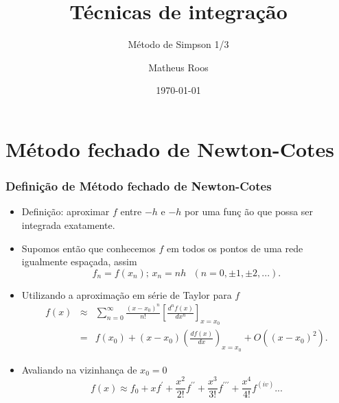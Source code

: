 \documentclass[xcolor=table]{beamer}
\begin{document}
\title[Simpson 1/3]{Técnicas de integração}
\subtitle{Método de Simpson 1/3}
\author[Roos]{Matheus Roos}
\date{\today}
\maketitle

\begin{frame}
	\tableofcontents
\end{frame}

\section{M\'{e}todo fechado de Newton-Cotes}

\begin{frame}%

\frametitle{Defini\c{c}\~{a}o de M\'{e}todo fechado de Newton-Cotes}

\begin{itemize}
\item Defini\c{c}\~{a}o: aproximar $f$ entre $-h$ e $-h$ por uma fun\c{c}%
\~{a}o que possa ser integrada exatamente.

\item Supomos ent\~{a}o que conhecemos $f$ em todos os pontos de uma rede
igualmente espa\c{c}ada, assim%
\[
f_{n}=f\left( x_{n}\right) \text{; \ \ \ \ \ \ \ }x_{n}=nh\text{ \ \ \ }%
\left( n=0,\pm 1,\pm 2,...\right) . 
\]

\item Utilizando a aproxima\c{c}\~{a}o em s\'{e}rie de Taylor para $f$%
\begin{eqnarray*}
f\left( x\right)  &\approx &\sum_{n=0}^{\infty }\frac{\left( x-x_{0}\right)
^{n}}{n!}\left[ \frac{d^{n}f(x)}{dx^{n}}\right] _{x=x_{0}} \\
&=&f\left( x_{0}\right) +\left( x-x_{0}\right) \left( \frac{df\left(
x\right) }{dx}\right) _{x=x_{0}}+O\left( \left( x-x_{0}\right) ^{2}\right) .
\end{eqnarray*}

\item Avaliando na vizinhan\c{c}a de $x_{0}=0$%
\[
f\left( x\right) \approx f_{0}+xf^{\prime }+\frac{x^{2}}{2!}f^{\prime \prime
}+\frac{x^{3}}{3!}f^{\prime \prime \prime }+\frac{x^{4}}{4!}f^{\left(
iv\right) }...
\]
\end{itemize}

\transboxout%
\end{frame}%
\end{document}
